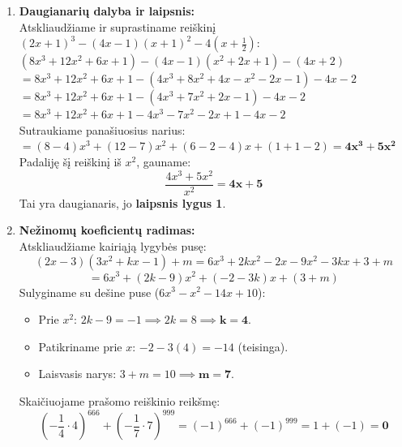 \documentclass[12pt,a4paper]{article}
\begin{document}
\begin{enumerate}
    \vspace{0.3cm}
    \item \textbf{Daugianarių dalyba ir laipsnis:} \\
    Atskliaudžiame ir suprastiname reiškinį $(2x+1)^3 - (4x-1)(x+1)^2 - 4\left(x+\frac{1}{2}\right)$: \\
    $ (8x^3 + 12x^2 + 6x + 1) - (4x-1)(x^2 + 2x + 1) - (4x + 2) $ \\
    $ = 8x^3 + 12x^2 + 6x + 1 - (4x^3 + 8x^2 + 4x - x^2 - 2x - 1) - 4x - 2 $ \\
    $ = 8x^3 + 12x^2 + 6x + 1 - (4x^3 + 7x^2 + 2x - 1) - 4x - 2 $ \\
    $ = 8x^3 + 12x^2 + 6x + 1 - 4x^3 - 7x^2 - 2x + 1 - 4x - 2 $ \\
    Sutraukiame panašiuosius narius: \\
    $ = (8-4)x^3 + (12-7)x^2 + (6-2-4)x + (1+1-2) = \mathbf{4x^3 + 5x^2} $ \\
    Padaliję šį reiškinį iš $x^2$, gauname:
    $$ \frac{4x^3 + 5x^2}{x^2} = \mathbf{4x + 5} $$
    Tai yra daugianaris, jo \textbf{laipsnis lygus 1}.

    \vspace{0.3cm}
    \item \textbf{Nežinomų koeficientų radimas:} \\
    Atskliaudžiame kairiąją lygybės pusę:
    $$ (2x-3)(3x^2+kx-1) + m = 6x^3 + 2kx^2 - 2x - 9x^2 - 3kx + 3 + m $$
    $$ = 6x^3 + (2k-9)x^2 + (-2-3k)x + (3+m) $$
    Sulyginame su dešine puse ($6x^3 - x^2 - 14x + 10$):
    \begin{itemize}
        \item Prie $x^2$: $2k - 9 = -1 \implies 2k = 8 \implies \mathbf{k = 4}$.
        \item Patikriname prie $x$: $-2 - 3(4) = -14$ (teisinga).
        \item Laisvasis narys: $3 + m = 10 \implies \mathbf{m = 7}$.
    \end{itemize}
    Skaičiuojame prašomo reiškinio reikšmę:
    $$ \left(-\frac{1}{4} \cdot 4\right)^{666} + \left(-\frac{1}{7} \cdot 7\right)^{999} = (-1)^{666} + (-1)^{999} = 1 + (-1) = \mathbf{0} $$

\end{enumerate}
\end{document}
